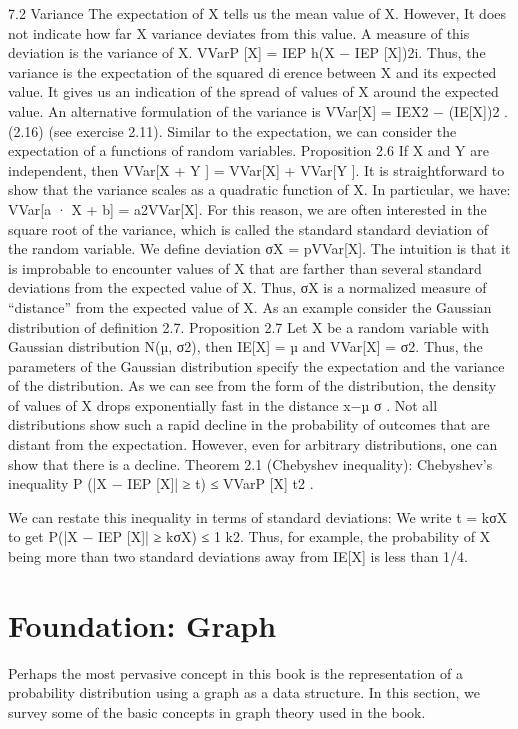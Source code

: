 7.2 Variance
The expectation of X tells us the mean value of X. However, It does not indicate how far X variance deviates from this value. A measure of this deviation is the variance of X. VVarP [X] = IEP h(X − IEP [X])2i. Thus, the variance is the expectation of the squared dierence between X and its expected value. It gives us an indication of the spread of values of X around the expected value. An alternative formulation of the variance is VVar[X] = IEX2 − (IE[X])2 . (2.16) (see exercise 2.11). Similar to the expectation, we can consider the expectation of a functions of random variables. Proposition 2.6 If X and Y are independent, then VVar[X + Y ] = VVar[X] + VVar[Y ]. It is straightforward to show that the variance scales as a quadratic function of X. In particular, we have: VVar[a · X + b] = a2VVar[X]. For this reason, we are often interested in the square root of the variance, which is called the standard standard deviation of the random variable. We define deviation σX = pVVar[X]. The intuition is that it is improbable to encounter values of X that are farther than several standard deviations from the expected value of X. Thus, σX is a normalized measure of “distance” from the expected value of X. As an example consider the Gaussian distribution of definition 2.7. Proposition 2.7 Let X be a random variable with Gaussian distribution N(µ, σ2), then IE[X] = µ and VVar[X] = σ2. Thus, the parameters of the Gaussian distribution specify the expectation and the variance of the distribution. As we can see from the form of the distribution, the density of values of X drops exponentially fast in the distance x−µ σ . Not all distributions show such a rapid decline in the probability of outcomes that are distant from the expectation. However, even for arbitrary distributions, one can show that there is a decline. Theorem 2.1 (Chebyshev inequality): Chebyshev’s inequality P (|X − IEP [X]| ≥ t) ≤ VVarP [X] t2 .

We can restate this inequality in terms of standard deviations: We write t = kσX to get P(|X − IEP [X]| ≥ kσX) ≤ 1 k2. Thus, for example, the probability of X being more than two standard deviations away from IE[X] is less than 1/4.

\section{Foundation: Graph}

Perhaps the most pervasive concept in this book is the representation of a probability distribution using a graph as a data structure. In this section, we survey some of the basic concepts in graph theory used in the book.

